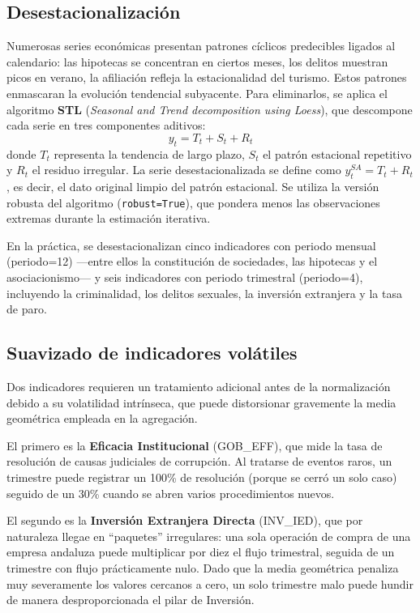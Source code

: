 \documentclass[12pt,a4paper]{article}
\begin{document}
\subsection{Desestacionalización}

Numerosas series económicas presentan patrones cíclicos predecibles ligados al calendario: las hipotecas se concentran en ciertos meses, los delitos muestran picos en verano, la afiliación refleja la estacionalidad del turismo. Estos patrones enmascaran la evolución tendencial subyacente. Para eliminarlos, se aplica el algoritmo \textbf{STL} (\textit{Seasonal and Trend decomposition using Loess}), que descompone cada serie en tres componentes aditivos:
\begin{equation}
y_t = T_t + S_t + R_t
\end{equation}
donde $T_t$ representa la tendencia de largo plazo, $S_t$ el patrón estacional repetitivo y $R_t$ el residuo irregular. La serie desestacionalizada se define como $y_t^{SA} = T_t + R_t$, es decir, el dato original limpio del patrón estacional. Se utiliza la versión robusta del algoritmo (\texttt{robust=True}), que pondera menos las observaciones extremas durante la estimación iterativa.

En la práctica, se desestacionalizan cinco indicadores con periodo mensual (periodo=12) ---entre ellos la constitución de sociedades, las hipotecas y el asociacionismo--- y seis indicadores con periodo trimestral (periodo=4), incluyendo la criminalidad, los delitos sexuales, la inversión extranjera y la tasa de paro.

\subsection{Suavizado de indicadores volátiles}

Dos indicadores requieren un tratamiento adicional antes de la normalización debido a su volatilidad intrínseca, que puede distorsionar gravemente la media geométrica empleada en la agregación.

El primero es la \textbf{Eficacia Institucional} (GOB\_EFF), que mide la tasa de resolución de causas judiciales de corrupción. Al tratarse de eventos raros, un trimestre puede registrar un 100\% de resolución (porque se cerró un solo caso) seguido de un 30\% cuando se abren varios procedimientos nuevos.

El segundo es la \textbf{Inversión Extranjera Directa} (INV\_IED), que por naturaleza llegae en ``paquetes'' irregulares: una sola operación de compra de una empresa andaluza puede multiplicar por diez el flujo trimestral, seguida de un trimestre con flujo prácticamente nulo. Dado que la media geométrica penaliza muy severamente los valores cercanos a cero, un solo trimestre malo puede hundir de manera desproporcionada el pilar de Inversión.
\end{document}
